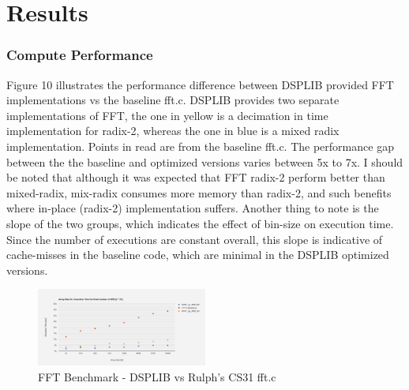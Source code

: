 


\section{Results}
\subsubsection{Compute Performance}
Figure 10 illustrates the performance difference between DSPLIB provided FFT implementations vs the baseline fft.c. DSPLIB provides two separate implementations of FFT, the one in yellow is a decimation in time implementation for radix-2, whereas the one in blue is a mixed radix implementation. Points in read are from the baseline fft.c. The performance gap between the the baseline and optimized versions varies between 5x to 7x. I should be noted that although it was expected that FFT radix-2 perform better than mixed-radix, mix-radix consumes more memory than radix-2, and such benefits where in-place (radix-2) implementation suffers. Another thing to note is the slope of the two groups, which indicates the effect of bin-size on execution time. Since the number of executions are constant overall, this slope is indicative of cache-misses in the baseline code, which are minimal in the DSPLIB optimized versions.
\begin{figure}[h!]
  \caption{FFT Benchmark - DSPLIB vs Rulph's CS31 fft.c}
  \includegraphics[width=0.5\textwidth]{images/fft.png}
\end{figure}\\

